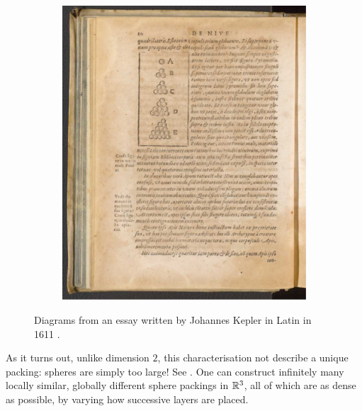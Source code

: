 \begin{figure}
\begin{subfigure}{\linewidth}
        \includegraphics[width=\linewidth]{Chapters/1_Intro/Images/Kepler_2.pdf}
        \caption{}
        \label{Ch1:Subfig:Kepler_Original_2}
    \end{subfigure}
    \caption{Diagrams from an essay written by Johannes Kepler in Latin in 1611 \cite{KeplerSnowflake}.}
\end{figure}

As it turns out, unlike dimension $2$, this characterisation not describe a unique packing: spheres are simply too large! See . One can construct infinitely many locally similar, globally different sphere packings in $\mathbb{R}^3$, all of which are as dense as possible, by varying how successive layers are placed.

